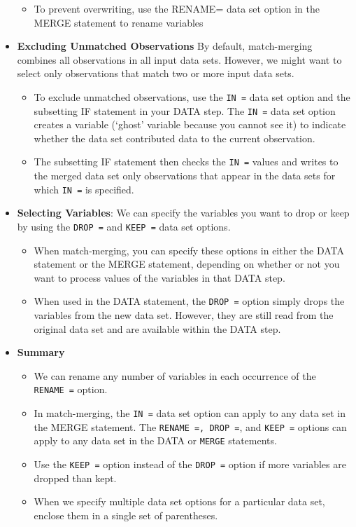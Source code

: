 \documentclass[
]{book}
\providecommand{\tightlist}{%
  \setlength{\itemsep}{0pt}\setlength{\parskip}{0pt}}
\begin{document}
\begin{itemize}
  \begin{itemize}
  \tightlist
  \item
    To prevent overwriting, use the RENAME= data set option in the MERGE statement to rename variables
  \end{itemize}
\item
  \textbf{Excluding Unmatched Observations} By default, match-merging combines all observations in all input data sets. However, we might want to select only observations that match two or more input data sets.

  \begin{itemize}
  \tightlist
  \item
    To exclude unmatched observations, use the \texttt{IN\ =} data set option and the subsetting IF statement in your DATA step. The \texttt{IN\ =} data set option creates a variable (`ghost' variable because you cannot see it) to indicate whether the data set contributed data to the current observation.
  \item
    The subsetting IF statement then checks the \texttt{IN\ =} values and writes to the merged data set only observations that appear in the data sets for which \texttt{IN\ =} is specified.
  \end{itemize}
\item
  \textbf{Selecting Variables}: We can specify the variables you want to drop or keep by using the \texttt{DROP\ =} and \texttt{KEEP\ =} data set options.

  \begin{itemize}
  \tightlist
  \item
    When match-merging, you can specify these options in either the DATA statement or the MERGE statement, depending on whether or not you want to process values of the variables in that DATA step.
  \item
    When used in the DATA statement, the \texttt{DROP\ =} option simply drops the variables from the new data set. However, they are still read from the original data set and are available within the DATA step.
  \end{itemize}
\item
  \textbf{Summary}

  \begin{itemize}
  \tightlist
  \item
    We can rename any number of variables in each occurrence of the \texttt{RENAME\ =} option.
  \item
    In match-merging, the \texttt{IN\ =} data set option can apply to any data set in the MERGE statement. The \texttt{RENAME\ =,\ DROP\ =}, and \texttt{KEEP\ =} options can apply to any data set in the DATA or \texttt{MERGE} statements.
  \item
    Use the \texttt{KEEP\ =} option instead of the \texttt{DROP\ =} option if more variables are dropped than kept.
  \item
    When we specify multiple data set options for a particular data set, enclose them in a single set of parentheses.
  \end{itemize}
\end{itemize}
\end{document}
